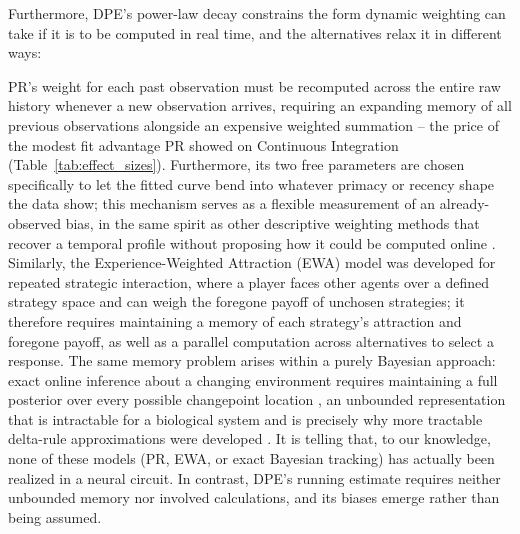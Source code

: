 Furthermore, DPE's power-law decay constrains the form dynamic weighting can take if it is to be computed in real time, and the alternatives relax it in different ways:

\begin{ms}
PR's weight for each past observation must be recomputed across the entire raw history whenever a new observation arrives, requiring an expanding memory of all previous observations alongside an expensive weighted summation -- the price of the modest fit advantage PR showed on Continuous Integration (Table~\ref{tab:effect_sizes}). Furthermore, its two free parameters are chosen specifically to let the fitted curve bend into whatever primacy or recency shape the data show; this mechanism serves as a flexible measurement of an already-observed bias, in the same spirit as other descriptive weighting methods that recover a temporal profile without proposing how it could be computed online \citep{anderson1965primacy, levi2018strategic, okazawa2018psychophysical}. Similarly, the Experience-Weighted Attraction (EWA) model \citep{camerer1999experience, ho2007selftuning} was developed for repeated strategic interaction, where a player faces other agents over a defined strategy space and can weigh the foregone payoff of unchosen strategies; it therefore requires maintaining a memory of each strategy's attraction and foregone payoff, as well as a parallel computation across alternatives to select a response. The same memory problem arises within a purely Bayesian approach: exact online inference about a changing environment requires maintaining a full posterior over every possible changepoint location \citep{adams2007bayesian}, an unbounded representation that is intractable for a biological system and is precisely why more tractable delta-rule approximations were developed \citep{wilson2013mixture}. It is telling that, to our knowledge, none of these models (PR, EWA, or exact Bayesian tracking) has actually been realized in a neural circuit. In contrast, DPE's running estimate requires neither unbounded memory nor involved calculations, and its biases emerge rather than being assumed.
\end{ms}


